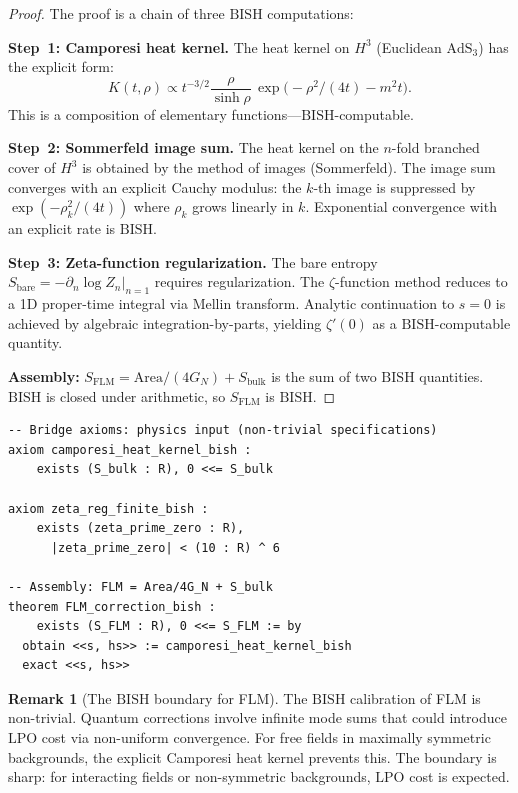 \documentclass[11pt,a4paper]{article}
\theoremstyle{plain}
\theoremstyle{definition}
\newtheorem{remark}[theorem]{Remark}
\newcommand{\LPO}{\ensuremath{\mathrm{LPO}}}
\newcommand{\BISH}{\ensuremath{\mathrm{BISH}}}
\newcommand{\AdS}{\ensuremath{\mathrm{AdS}}}
\newcommand{\GN}{\ensuremath{G_N}}
\begin{document}
\begin{proof}
The proof is a chain of three $\BISH$ computations:

\medskip\noindent
\textbf{Step~1: Camporesi heat kernel.}
The heat kernel on $H^3$ (Euclidean $\AdS_3$) has the explicit form:
\[
  K(t,\rho) \propto t^{-3/2}
    \frac{\rho}{\sinh\rho}\,
    \exp\!\bigl(-\rho^2/(4t) - m^2 t\bigr).
\]
This is a composition of elementary functions---$\BISH$-computable.

\medskip\noindent
\textbf{Step~2: Sommerfeld image sum.}
The heat kernel on the $n$-fold branched cover of $H^3$ is obtained
by the method of images (Sommerfeld).  The image sum converges with
an explicit Cauchy modulus: the $k$-th image is suppressed by
$\exp(-\rho_k^2/(4t))$ where $\rho_k$ grows linearly in $k$.
Exponential convergence with an explicit rate is $\BISH$.

\medskip\noindent
\textbf{Step~3: Zeta-function regularization.}
The bare entropy $S_{\mathrm{bare}} = -\partial_n \log Z_n|_{n=1}$
requires regularization.  The $\zeta$-function method reduces to a
1D proper-time integral via Mellin transform.  Analytic continuation
to $s = 0$ is achieved by algebraic integration-by-parts, yielding
$\zeta'(0)$ as a $\BISH$-computable quantity.

\medskip\noindent
\textbf{Assembly:} $S_{\mathrm{FLM}} = \text{Area}/(4\GN) + S_{\mathrm{bulk}}$
is the sum of two $\BISH$ quantities.  $\BISH$ is closed under arithmetic,
so $S_{\mathrm{FLM}}$ is $\BISH$.
\end{proof}

\begin{lstlisting}[caption={FLM correction and heat kernel: \texttt{FLMCorrection.lean}}]
-- Bridge axioms: physics input (non-trivial specifications)
axiom camporesi_heat_kernel_bish :
    exists (S_bulk : R), 0 <<= S_bulk

axiom zeta_reg_finite_bish :
    exists (zeta_prime_zero : R),
      |zeta_prime_zero| < (10 : R) ^ 6

-- Assembly: FLM = Area/4G_N + S_bulk
theorem FLM_correction_bish :
    exists (S_FLM : R), 0 <<= S_FLM := by
  obtain <<s, hs>> := camporesi_heat_kernel_bish
  exact <<s, hs>>
\end{lstlisting}

\begin{remark}[The $\BISH$ boundary for FLM]
The $\BISH$ calibration of FLM is non-trivial.  Quantum corrections
involve infinite mode sums that could introduce $\LPO$ cost via
non-uniform convergence.  For free fields in maximally symmetric
backgrounds, the explicit Camporesi heat kernel prevents this.
The boundary is sharp: for interacting fields or non-symmetric
backgrounds, $\LPO$ cost is expected.
\end{remark}
\end{document}
